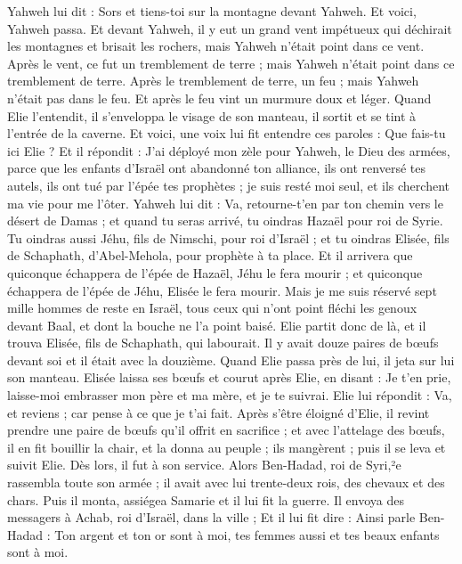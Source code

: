 \begin{multicols}{2}
Yahweh lui dit : Sors et tiens-toi sur la montagne devant Yahweh. Et voici, Yahweh passa. Et devant Yahweh, il y eut un grand vent impétueux qui déchirait les montagnes et brisait les rochers, mais Yahweh n'était point dans ce vent. Après le vent, ce fut un tremblement de terre ; mais Yahweh n'était point dans ce tremblement de terre.
Après le tremblement de terre, un feu ; mais Yahweh n'était pas dans le feu. Et après le feu vint un murmure doux et léger.
Quand Elie l'entendit, il s’enveloppa le visage de son manteau, il sortit et se tint à l'entrée de la caverne. Et voici, une voix lui fit entendre ces paroles : Que fais-tu ici Elie ?
Et il répondit : J'ai déployé mon zèle pour Yahweh, le Dieu des armées, parce que les enfants d'Israël ont abandonné ton alliance, ils ont renversé tes autels, ils ont tué par l'épée tes prophètes ; je suis resté moi seul, et ils cherchent ma vie pour me l'ôter.
Yahweh lui dit : Va, retourne-t'en par ton chemin vers le désert de Damas ; et quand tu seras arrivé, tu oindras Hazaël pour roi de Syrie.
Tu oindras aussi Jéhu, fils de Nimschi, pour roi d’Israël ; et tu oindras Elisée, fils de Schaphath, d'Abel-Mehola, pour prophète à ta place.
Et il arrivera que quiconque échappera de l'épée de Hazaël, Jéhu le fera mourir ; et quiconque échappera de l'épée de Jéhu, Elisée le fera mourir.
Mais je me suis réservé sept mille hommes de reste en Israël, tous ceux qui n'ont point fléchi les genoux devant Baal, et dont la bouche ne l'a point baisé.
Elie partit donc de là, et il trouva Elisée, fils de Schaphath, qui labourait. Il y avait douze paires de bœufs devant soi et il était avec la douzième. Quand Elie passa près de lui, il jeta sur lui son manteau.
Elisée laissa ses bœufs et courut après Elie, en disant : Je t’en prie, laisse-moi embrasser mon père et ma mère, et je te suivrai. Elie lui répondit : Va, et reviens ; car pense à ce que je t'ai fait.
Après s’être éloigné d’Elie, il revint prendre une paire de bœufs qu’il offrit en sacrifice ; et avec l'attelage des bœufs, il en fit bouillir la chair, et la donna au peuple ; ils mangèrent ; puis il se leva et suivit Elie. Dès lors, il fut à son service.
\VerseOne{}Alors Ben-Hadad, roi de Syri,²e rassembla toute son armée ; il avait avec lui trente-deux rois, des chevaux et des chars. Puis il monta, assiégea Samarie et il lui fit la guerre.
Il envoya des messagers à Achab, roi d'Israël, dans la ville ;
Et il lui fit dire : Ainsi parle Ben-Hadad : Ton argent et ton or sont à moi, tes femmes aussi et tes beaux enfants sont à moi.

\end{multicols}
